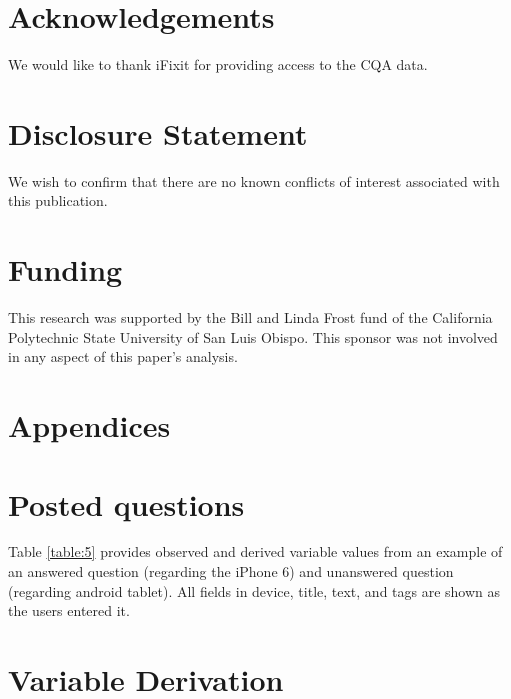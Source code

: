 \documentclass[]{interact}\usepackage[]{graphicx}\usepackage[]{color}
\begin{document}
% 

\section*{Acknowledgements}

 We would like to thank iFixit for providing access to the CQA data.
 
\section*{Disclosure Statement}

We wish to confirm that there are no known conflicts of interest associated with this publication.

\section*{Funding}
 
This research was supported by the Bill and Linda Frost fund of the California Polytechnic State University of San Luis Obispo. This sponsor was not involved in any aspect of this paper's analysis.






\section{Appendices}

\appendix

\section{Posted questions}

Table \ref{table:5} provides observed and derived variable values from an example of an answered question (regarding the iPhone 6) and unanswered question (regarding android tablet). All fields in device, title, text, and tags are shown as the users entered it. 


\section{Variable Derivation}
\end{document}
